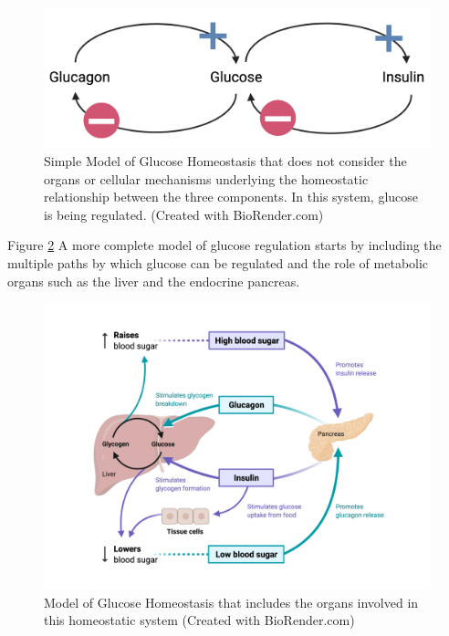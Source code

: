 \begin{figure}[!ht]
    \centering
    \includegraphics[width=1\linewidth]{./figure/glucose_homeo.png}
    \caption{Simple Model of Glucose Homeostasis that does not consider the organs or cellular mechanisms underlying the homeostatic relationship between the three components. In this system, glucose is being regulated. \footnotesize{(Created with BioRender.com)}}
    \label{fig:glucose_homeo}
\end{figure}

Figure \ref{fig:complete_glucose_homeo} A more complete model of glucose regulation starts by including the multiple paths by which glucose can be regulated and the role of metabolic organs such as the liver and the endocrine pancreas.

\begin{figure}[!ht]
    \centering
    \includegraphics[width=1\linewidth]{./figure/complete_glucose_homeo.png}
    \caption{Model of Glucose Homeostasis that includes the organs involved in this homeostatic system \footnotesize{(Created with BioRender.com)}}
    \label{fig:complete_glucose_homeo}
\end{figure}

